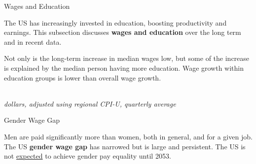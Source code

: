 \begin{minipage}{0.76\textwidth}   
\normalsize{Wages and Education}
\vspace*{-1mm}

\small The US has increasingly invested in education, boosting productivity and earnings. This subsection discusses \textbf{wages and education} over the long term and in recent data. 



Not only is the long-term increase in median wages low, but some of the increase is explained by the median person having more education. Wage growth within education groups is lower than overall wage growth. 

\\
\footnotesize{\textit{dollars, adjusted using regional CPI-U, quarterly average}}\\
\vspace{3mm}

\normalsize{Gender Wage Gap}  
\vspace*{-1mm}

\small Men are paid significantly more than women, both in general, and for a given job. The US \textbf{gender wage gap} has narrowed but is large and persistent. The US is not \href{https://iwpr.org/gender-and-racial-wage-gaps-marginally-improve-in-2022-but-pay-equity-still-decades-away/}{expected} to achieve gender pay equality until 2053. 
\end{minipage}

